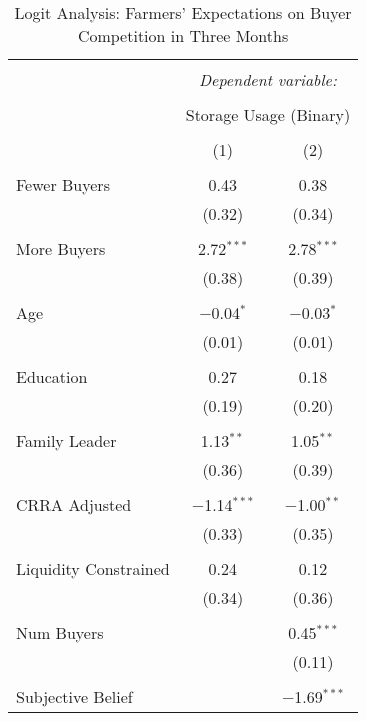 
\begin{table}[!htbp] \centering 
  \caption{Logit Analysis: Farmers' Expectations on Buyer Competition in Three Months} 
  \label{tab: binary storage ~ farmer's expectation on movement} 
\footnotesize 
\begin{tabular}{@{\extracolsep{5pt}}lcc} 
\\[-1.8ex]\hline 
\hline \\[-1.8ex] 
 & \multicolumn{2}{c}{\textit{Dependent variable:}} \\ 
\cline{2-3} 
\\[-1.8ex] & \multicolumn{2}{c}{Storage Usage (Binary)} \\ 
\\[-1.8ex] & (1) & (2)\\ 
\hline \\[-1.8ex] 
 Fewer Buyers & 0.43 & 0.38 \\ 
  & (0.32) & (0.34) \\ 
  & & \\ 
 More Buyers & 2.72$^{***}$ & 2.78$^{***}$ \\ 
  & (0.38) & (0.39) \\ 
  & & \\ 
 Age & $-$0.04$^{*}$ & $-$0.03$^{*}$ \\ 
  & (0.01) & (0.01) \\ 
  & & \\ 
 Education & 0.27 & 0.18 \\ 
  & (0.19) & (0.20) \\ 
  & & \\ 
 Family Leader & 1.13$^{**}$ & 1.05$^{**}$ \\ 
  & (0.36) & (0.39) \\ 
  & & \\ 
 CRRA Adjusted & $-$1.14$^{***}$ & $-$1.00$^{**}$ \\ 
  & (0.33) & (0.35) \\ 
  & & \\ 
 Liquidity Constrained & 0.24 & 0.12 \\ 
  & (0.34) & (0.36) \\ 
  & & \\ 
 Num Buyers &  & 0.45$^{***}$ \\ 
  &  & (0.11) \\ 
  & & \\ 
 Subjective Belief &  & $-$1.69$^{***}$ \\ 

\end{tabular}
\end{table}
